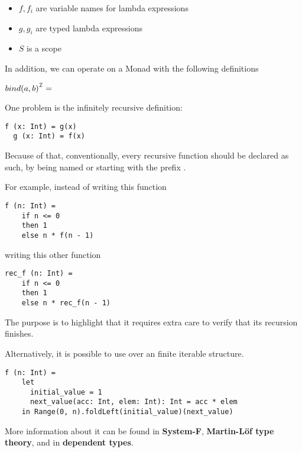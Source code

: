 \begin{itemize}
    \item $f, f_{i}$ are variable names for lambda expressions
    \item $g, g_{i}$ are typed lambda expressions
    \item $S$ is a scope
\end{itemize}


In addition, we can operate on a Monad with the following definitions

${bind(a, b)}^{\mathcal{I}} = $


One problem is the infinitely recursive definition:
\begin{lstlisting}[label={lst:exampleOfRecursion}]
  f (x: Int) = g(x)
  g (x: Int) = f(x)
\end{lstlisting}

Because of that, conventionally, every recursive function should be declared as such, by being named or starting with the prefix .

For example, instead of writing this function
\begin{lstlisting}[label={lst:exampleOfFactorialBadNaming}]
  f (n: Int) =
    if n <= 0
    then 1
    else n * f(n - 1)
\end{lstlisting}

writing this other function
\begin{lstlisting}[label={lst:exampleOfFactorialGoodNaming}]
  rec_f (n: Int) =
    if n <= 0
    then 1
    else n * rec_f(n - 1)
\end{lstlisting}

The purpose is to highlight that it requires extra care to verify that its recursion finishes.

Alternatively, it is possible to use  over an finite iterable structure.
\begin{lstlisting}[label={lst:exampleOfFactorialFoldLeft}]
  f (n: Int) =
    let
      initial_value = 1
      next_value(acc: Int, elem: Int): Int = acc * elem
    in Range(0, n).foldLeft(initial_value)(next_value)
\end{lstlisting}

More information about it can be found in \textbf{System-F}, \textbf{Martin-L\"{o}f type theory}, and in \textbf{dependent types}.
